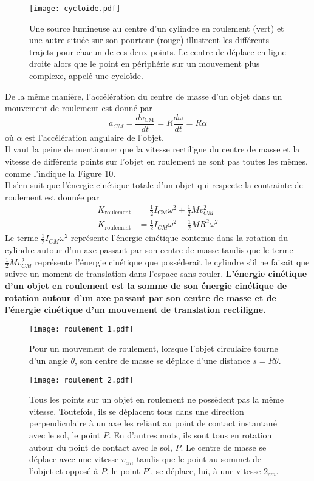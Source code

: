 \documentclass[titlepage,oneside,a4paper,11pt]{book} %
\begin{document}
\begin{figure}[H]
\centering
\texttt{[image: cycloide.pdf]}
\caption{Une source lumineuse au centre d'un cylindre en roulement (vert) et une autre située sur son pourtour (rouge) illustrent les différents trajets pour chacun de ces deux points. Le centre de déplace en ligne droite alors que le point en périphérie sur un mouvement plus complexe, appelé une cycloïde.}
\end{figure}

De la même manière, l'accélération du centre de masse d'un objet dans un mouvement de roulement est donné par
\begin{equation}
a_{CM}=\frac{d v_{\mathrm{CM}}}{d t}=R \frac{d \omega}{d t}=R \alpha
\end{equation}
où $\alpha$ est l'accélération angulaire de l'objet.\\

Il vaut la peine de mentionner que la vitesse rectiligne du centre de masse et la vitesse de différents points sur l'objet en roulement ne sont pas toutes les mêmes, comme l'indique la Figure 10.\\

Il s'en suit que l'énergie cinétique totale d'un objet qui respecte la contrainte de roulement est donnée par
\begin{align}
K_{\mathrm{roulement}}&=\frac{1}{2} I_{\mathrm{CM}} \omega^{2}+\frac{1}{2} M v_{CM}^{2} \nonumber \\
K_{\mathrm{roulement}}&= \frac{1}{2} I_{CM} \omega^{2}+\frac{1}{2} M R^{2} \omega^{2}
\end{align}
Le terme $\frac{1}{2}I_{CM}\omega^2$ représente l'énergie cinétique contenue dans la rotation du cylindre autour d'un axe passant par son centre de masse tandis que le terme $\frac{1}{2} M v_{CM}^{2}$ représente l'énergie cinétique que posséderait le cylindre s'il ne faisait que suivre un moment de translation dans l'espace sans rouler. \textbf{L'énergie cinétique d'un objet en roulement est la somme de son énergie cinétique de rotation autour d'un axe passant par son centre de masse et de l'énergie cinétique d'un mouvement de translation rectiligne.}

\begin{figure}[H]
\centering
\texttt{[image: roulement\_1.pdf]}
\caption{Pour un mouvement de roulement, lorsque l'objet circulaire tourne d'un angle $\theta$, son centre de masse se déplace d'une distance $s=R\theta$.}
\end{figure}

\begin{figure}[H]
\centering
\texttt{[image: roulement\_2.pdf]}
\caption{Tous les points sur un objet en roulement ne possèdent pas la même vitesse. Toutefois, ils se déplacent tous dans une direction perpendiculaire à un axe les reliant au point de contact instantané avec le sol, le point $P$. En d'autres mots, ils sont tous en rotation autour du point de contact avec le sol, $P$. Le centre de masse se déplace avec une vitesse $v_{cm}$ tandis que le point au sommet de l'objet et opposé à $P$, le point $P'$, se déplace, lui, à une vitesse $2_{cm}$.}
\end{figure}
\end{document}
